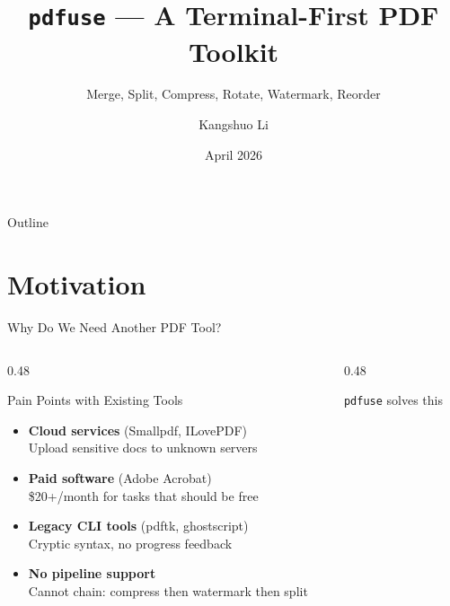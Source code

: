\documentclass[aspectratio=169]{beamer}
\title[\texttt{pdfuse}]{\texttt{pdfuse} --- A Terminal-First PDF Toolkit}
\subtitle{Merge, Split, Compress, Rotate, Watermark, Reorder}
\author{Kangshuo Li}
\date{April 2026}
\institute{Final Project Presentation}
\begin{document}

\begin{frame}
  \titlepage
\end{frame}

\begin{frame}{Outline}
  \tableofcontents
\end{frame}

\section{Motivation}

\begin{frame}{Why Do We Need Another PDF Tool?}
  \begin{columns}[T]
    \begin{column}{0.48\textwidth}
      \begin{alertblock}{Pain Points with Existing Tools}
        \begin{itemize}
          \item \textbf{Cloud services} (Smallpdf, ILovePDF)\\
                {\small Upload sensitive docs to unknown servers}
          \vspace{4pt}
          \item \textbf{Paid software} (Adobe Acrobat)\\
                {\small \$20+/month for tasks that should be free}
          \vspace{4pt}
          \item \textbf{Legacy CLI tools} (pdftk, ghostscript)\\
                {\small Cryptic syntax, no progress feedback}
          \vspace{4pt}
          \item \textbf{No pipeline support}\\
                {\small Cannot chain: compress then watermark then split}
        \end{itemize}
      \end{alertblock}
    \end{column}
    \begin{column}{0.48\textwidth}
      \begin{block}{\texttt{pdfuse} solves this}
        \begin{itemize}

\end{itemize}
\end{block}
\end{column}
\end{columns}
\end{frame}
\end{document}
